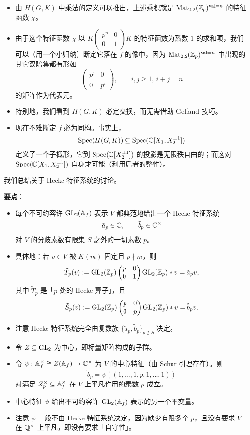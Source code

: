 \begin{itemize}
\begin{itemize}
\item 由 $H(G,K)$ 中乘法的定义可以推出，上述乘积就是 $\mathrm{Mat}_{2,2}(\mathbb{Z}_p)^{\mathrm{val}=n}$ 的特征函数 $\chi$。
\item 由于这个特征函数 $\chi$ 以 $K\begin{pmatrix}p^n&0\\0&1\end{pmatrix}K$ 的特征函数为系数 $1$ 的求和项，我们可以（用一个小归纳）断定它落在 $f$ 的像中，因为 $\mathrm{Mat}_{2,2}(\mathbb{Z}_p)^{\mathrm{val}=n}$ 中出现的其它双陪集都有形如
\[
\begin{pmatrix}p^j&0\\0&p^i\end{pmatrix},\qquad i,j\ge1,\ i+j=n
\]
的矩阵作为代表元。
\item 特别地，我们看到 $H(G,K)$ 必定交换，而无需借助 Gelfand 技巧。
\item 现在不难断定 $f$ 必为同构。事实上，
\[
\operatorname{Spec}(H(G,K))\subseteq\operatorname{Spec}(\mathbb{C}[X_1,X_2^{\pm1}])
\]
定义了一个子概形，它到 $\operatorname{Spec}(\mathbb{C}[X_2^{\pm1}])$ 的投影是无限秩自由的；而这对 $\operatorname{Spec}(\mathbb{C}[X_1,X_2^{\pm1}])$ 自身才可能（利用后者的整性）。
\end{itemize}
\end{itemize}

我们总结关于 Hecke 特征系统的讨论。

\textbf{要点}：
\begin{itemize}
\item 每个不可约容许 $\operatorname{GL}_2(\mathbb{A}_f)$-表示 $V$ 都典范地给出一个 Hecke 特征系统
\[
\tilde a_p\in\mathbb{C},\qquad \tilde b_p\in\mathbb{C}^\times
\]
对 $V$ 的分歧素数有限集 $S$ 之外的一切素数 $p$。
\item 具体地：若 $v\in V$ 被 $K(m)$ 固定且 $p\nmid m$，则
\[
\tilde T_p(v):=\operatorname{GL}_2(\mathbb{Z}_p)\begin{pmatrix}p&0\\0&1\end{pmatrix}\operatorname{GL}_2(\mathbb{Z}_p)*v=\tilde a_pv,
\]
其中 $\tilde T_p$ 是「$p$ 处的 Hecke 算子」，且
\[
\tilde S_p(v):=\operatorname{GL}_2(\mathbb{Z}_p)\begin{pmatrix}p&0\\0&p\end{pmatrix}\operatorname{GL}_2(\mathbb{Z}_p)*v=\tilde b_pv.
\]
\item 注意 Hecke 特征系统完全由复数族 $\{\tilde a_p,\tilde b_p\}_{p\notin S}$ 决定。
\item 令 $Z\subseteq\operatorname{GL}_2$ 为中心，即标量矩阵构成的子群。
\item 令 $\psi:\mathbb{A}_f^\times\cong Z(\mathbb{A}_f)\to\mathbb{C}^\times$ 为 $V$ 的中心特征（由 Schur 引理存在）。则
\[
\tilde b_p=\psi((1,\dots,1,p,1,\dots,1))
\]
对满足 $Z_p^\times\subseteq\mathbb{A}_f^\times$ 在 $V$ 上平凡作用的素数 $p$ 成立。
\item 中心特征 $\psi$ 给出不可约容许 $\operatorname{GL}_2(\mathbb{A}_f)$-表示的另一个不变量。
\item 注意 $\psi$ 一般不由 Hecke 特征系统决定，因为缺少有限多个 $p$，且没有要求 $V$ 在 $\mathbb{Q}^\times$ 上平凡，即没有要求「自守性」。
\end{itemize}

